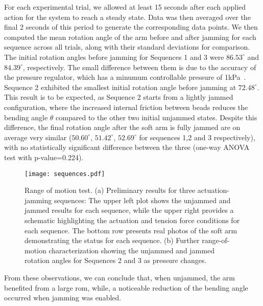 For each experimental trial, we allowed at least 15 seconds after each applied action for the system to reach a steady state. Data was then averaged over the final 2 seconds of this period to generate the corresponding data points. We then computed the mean rotation angle of the arm before and after jamming for each sequence across all trials, along with their standard deviations for comparison. 
The initial rotation angles before jamming for Sequences 1 and 3 were $86.53^\circ$ and $84.39^\circ$, respectively. The small difference between them is due to the accuracy of the pressure regulator, which has a minumum controllable pressure of 1kPa~\cite{festo_vppe_datasheet}. Sequence 2 exhibited the smallest initial rotation angle before jamming at $72.48^\circ$.
This result is to be expected, as Sequence 2 starts from a lightly jammed configuration, where the increased internal friction between beads reduces the bending angle $\theta$ compared to the other two initial unjammed states. Despite this difference, the final rotation angle after the soft arm is fully jammed are on average very similar ($50.60^{\circ}$, $51.42^{\circ}$, $52.69^{\circ}$ for sequences 1,2 and 3 respectively), with no statistically significant difference between the three (one-way ANOVA test with p-value=0.224).


\begin{figure}[]
    \centering
    \texttt{[image: sequences.pdf]}
    \caption{Range of motion test. (a) Preliminary results for three actuation-jamming sequences: The upper left plot shows the unjammed and jammed results for each sequence, while the upper right provides a schematic highlighting the actuation and tension force conditions for each sequence. The bottom row presents real photos of the soft arm demonstrating the status for each sequence. (b) Further range-of-motion characterization showing the unjammed and jammed rotation angles for Sequences 2 and 3 as pressure changes.}
    \label{fig:RoM}
    \vspace{-2em}
\end{figure}

From these observations, we can conclude that, when unjammed, the arm benefited from a large \gls{rom}, while, a noticeable reduction of the bending angle occurred when jamming was enabled. 

